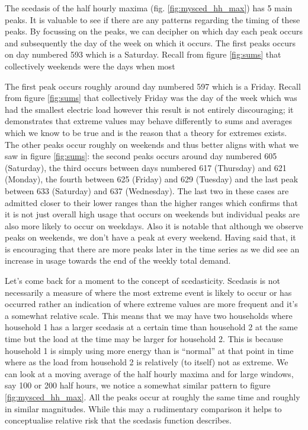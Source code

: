 The scedasis of the half hourly maxima (fig. \ref{fig:mysced_hh_max}) has 5 main peaks. It is valuable to see if there are any patterns regarding the timing of these peaks. By focussing on the peaks, we can decipher on which day each peak occurs and subsequently the day of the week on which it occurs. The first peaks occurs on day numbered 593 which is a Saturday. Recall from figure \ref{fig:sums} that collectively weekends were the days when most 


The first peak occurs roughly around day numbered 597 which is a Friday. Recall from figure \ref{fig:sums} that collectively Friday was the day of the week which was had the smallest electric load however this result is not entirely discouraging; it demonstrates that extreme values may behave differently to sums and averages which we know to be true and is the reason that a theory for extremes exists. The other peaks occur roughly on weekends and thus better aligns with what we saw in figure \ref{fig:sums}: the second peaks occurs around day numbered 605 (Saturday), the third occurs between days numbered 617 (Thursday) and 621 (Monday), the fourth between 625 (Friday) and 629 (Tuesday) and the last peak between 633 (Saturday) and 637 (Wednesday). The last two in these cases are admitted closer to their lower ranges than the higher ranges which confirms that it is not just overall high usage that occurs on weekends but individual peaks are also more likely to occur on weekdays. Also it is notable that although we observe peaks on weekends, we don't have a peak at every weekend. Having said that, it is encouraging that there are more peaks later in the time series as we did see an increase in usage towards the end of the weekly total demand.

Let's come back for a moment to the concept of scedasticity. Scedasis is not necessarily a measure of where the most extreme event is likely to occur or has occurred rather an indication of where extreme values are more frequent and it's a somewhat relative scale. This means that we may have two households where household 1 has a larger scedasis at a certain time than household 2 at the same time but the load at the time may be larger for household 2. This is because household 1 is simply using more energy than is ``normal'' at that point in time where as the load from household 2 is relatively (to itself) not as extreme.%
We can look at a moving average of the half hourly maxima and for large windows, say 100 or 200 half hours, we notice a somewhat similar pattern to figure \ref{fig:mysced_hh_max}.  All the peaks occur at roughly the same time and roughly in similar magnitudes. While this may a rudimentary comparison it helps to conceptualise relative risk that the scedasis function describes.

